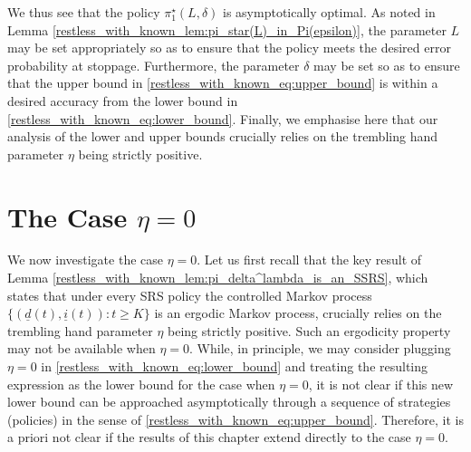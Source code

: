 We thus see that the policy $\pi_1^\star(L,\delta)$ is asymptotically optimal. As noted in Lemma \ref{restless_with_known_lem:pi_star(L)_in_Pi(epsilon)}, the parameter $L$ may be set appropriately so as to ensure that the policy meets the desired error probability at stoppage. Furthermore, the parameter $\delta$ may be set so as to ensure that the upper bound in \eqref{restless_with_known_eq:upper_bound} is within a desired accuracy from the lower bound in \eqref{restless_with_known_eq:lower_bound}. Finally, we emphasise here that our analysis of the lower and upper bounds crucially relies on the trembling hand parameter $\eta$ being strictly positive.

\section{The Case $\eta=0$}\label{restless_with_known_sec:case_eta_=_0}
{\color{black} We now investigate the case $\eta=0$. Let us first recall that the key result of Lemma \ref{restless_with_known_lem:pi_delta^lambda_is_an_SSRS}, which states that under every SRS policy the controlled Markov process $\{(\underline{d}(t), \underline{i}(t)):t\geq K\}$ is an ergodic Markov process, crucially relies on the trembling hand parameter $\eta$ being strictly positive. Such an ergodicity property may not be available when $\eta=0$. While, in principle, we may consider plugging $\eta=0$ in \eqref{restless_with_known_eq:lower_bound} and treating the resulting expression as the lower bound for the case when $\eta=0$, it is not clear if this new lower bound can be approached asymptotically through a sequence of strategies (policies) in the sense of \eqref{restless_with_known_eq:upper_bound}. 
Therefore, it is a priori not clear if the results of this chapter extend directly to the case $\eta=0$.}

